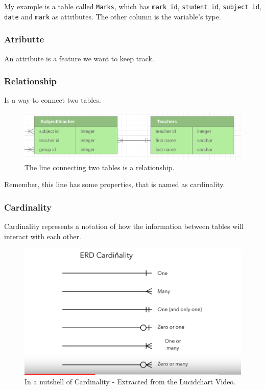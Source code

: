 \documentclass[]{book}
\begin{document}
My example is a table called \texttt{Marks}, which has
\texttt{mark\ id}, \texttt{student\ id}, \texttt{subject\ id},
\texttt{date} and \texttt{mark} as attributes. The other column is the
variable's type.

\subsubsection{Atributte}\label{atributte}

An attribute is a feature we want to keep track.

\subsubsection{Relationship}\label{relationship}

Is a way to connect two tables.

\begin{figure}
\centering
\includegraphics{01-img/2.png}
\caption{The line connecting two tables is a relationship.}
\end{figure}

Remember, this line has some properties, that is named as cardinality.

\subsubsection{Cardinality}\label{cardinality}

Cardinality represents a notation of how the information between tables
will interact with each other.

\begin{figure}
\centering
\includegraphics{01-img/3.png}
\caption{In a nutshell of Cardinality - Extracted from the Lucidchart
Video.}
\end{figure}
\end{document}
